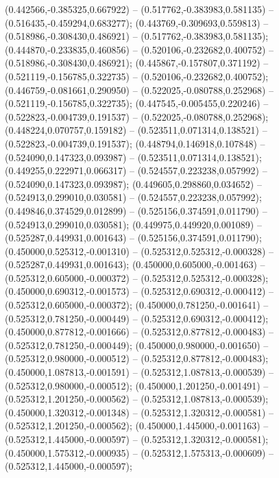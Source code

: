  (0.442566,-0.385325,0.667922) -- (0.517762,-0.383983,0.581135) -- (0.516435,-0.459294,0.683277);
 (0.443769,-0.309693,0.559813) -- (0.518986,-0.308430,0.486921) -- (0.517762,-0.383983,0.581135);
 (0.444870,-0.233835,0.460856) -- (0.520106,-0.232682,0.400752) -- (0.518986,-0.308430,0.486921);
 (0.445867,-0.157807,0.371192) -- (0.521119,-0.156785,0.322735) -- (0.520106,-0.232682,0.400752);
 (0.446759,-0.081661,0.290950) -- (0.522025,-0.080788,0.252968) -- (0.521119,-0.156785,0.322735);
 (0.447545,-0.005455,0.220246) -- (0.522823,-0.004739,0.191537) -- (0.522025,-0.080788,0.252968);
 (0.448224,0.070757,0.159182) -- (0.523511,0.071314,0.138521) -- (0.522823,-0.004739,0.191537);
 (0.448794,0.146918,0.107848) -- (0.524090,0.147323,0.093987) -- (0.523511,0.071314,0.138521);
 (0.449255,0.222971,0.066317) -- (0.524557,0.223238,0.057992) -- (0.524090,0.147323,0.093987);
 (0.449605,0.298860,0.034652) -- (0.524913,0.299010,0.030581) -- (0.524557,0.223238,0.057992);
 (0.449846,0.374529,0.012899) -- (0.525156,0.374591,0.011790) -- (0.524913,0.299010,0.030581);
 (0.449975,0.449920,0.001089) -- (0.525287,0.449931,0.001643) -- (0.525156,0.374591,0.011790);
 (0.450000,0.525312,-0.001310) -- (0.525312,0.525312,-0.000328) -- (0.525287,0.449931,0.001643);
 (0.450000,0.605000,-0.001463) -- (0.525312,0.605000,-0.000372) -- (0.525312,0.525312,-0.000328);
 (0.450000,0.690312,-0.001573) -- (0.525312,0.690312,-0.000412) -- (0.525312,0.605000,-0.000372);
 (0.450000,0.781250,-0.001641) -- (0.525312,0.781250,-0.000449) -- (0.525312,0.690312,-0.000412);
 (0.450000,0.877812,-0.001666) -- (0.525312,0.877812,-0.000483) -- (0.525312,0.781250,-0.000449);
 (0.450000,0.980000,-0.001650) -- (0.525312,0.980000,-0.000512) -- (0.525312,0.877812,-0.000483);
 (0.450000,1.087813,-0.001591) -- (0.525312,1.087813,-0.000539) -- (0.525312,0.980000,-0.000512);
 (0.450000,1.201250,-0.001491) -- (0.525312,1.201250,-0.000562) -- (0.525312,1.087813,-0.000539);
 (0.450000,1.320312,-0.001348) -- (0.525312,1.320312,-0.000581) -- (0.525312,1.201250,-0.000562);
 (0.450000,1.445000,-0.001163) -- (0.525312,1.445000,-0.000597) -- (0.525312,1.320312,-0.000581);
 (0.450000,1.575312,-0.000935) -- (0.525312,1.575313,-0.000609) -- (0.525312,1.445000,-0.000597);
